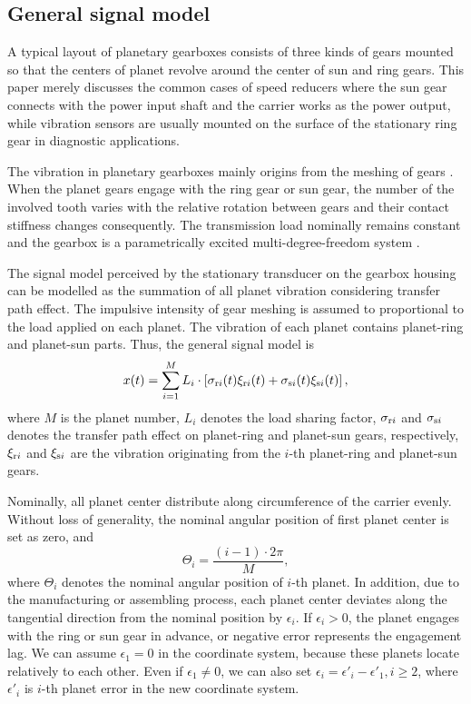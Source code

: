 \documentclass[a4paper,fleqn]{cas-sc}%
\begin{document}
\subsection{General signal model}
\par A typical layout of planetary gearboxes consists of three kinds of gears mounted so that the centers of planet revolve around the center of sun and ring gears. This paper merely discusses the common cases of speed reducers where the sun gear connects with the power input shaft and the carrier works as the power output, while vibration sensors are usually mounted on the surface of the stationary ring gear in diagnostic applications. 

\par The vibration in planetary gearboxes mainly origins from the meshing of gears \cite{Velex1996}. When the planet gears engage with the ring gear or sun gear, the number of the involved tooth varies with the relative rotation between gears and their contact stiffness changes consequently. The transmission load nominally remains constant and the gearbox is a parametrically excited multi-degree-freedom system \cite{Acar2019}. 
\par The signal model perceived by the stationary transducer on the gearbox housing can be modelled as the summation of all planet vibration considering transfer path effect. The impulsive intensity of gear meshing is assumed to proportional to the load applied on each planet. The vibration of each planet contains planet-ring and planet-sun parts. Thus, the general signal model is
\begin{equation}
    x(t)=\sum_{i=1}^{M} L_i \cdot \left[ \sigma_{{\rm r}i}(t) \xi_{{\rm r}i}(t) + \sigma_{{\rm s}i}(t) \xi_{{\rm s}i}(t) \right], \label{eq:general_signal}
\end{equation}
where $M$ is the planet number, $L_i$ denotes the load sharing factor, $\sigma_{{\rm r}i}$ and $\sigma_{{\rm s}i}$ denotes the transfer path effect on planet-ring and planet-sun gears, respectively, $\xi_{{\rm r}i}$ and $\xi_{{\rm s}i}$ are the vibration originating from the $i$-th planet-ring and planet-sun gears.
\par Nominally, all planet center distribute along circumference of the carrier evenly. Without loss of generality, the nominal angular position of first planet center is set as zero, and
\begin{equation}
    \Theta_i=\frac{(i-1)\cdot 2\pi}{M},
\end{equation}
where $\Theta_i$ denotes the nominal angular position of $i$-th planet. In addition, due to the manufacturing or assembling process, each planet center deviates along the tangential direction from the nominal position by $\epsilon_i$. If $\epsilon_i>0$, the planet engages with the ring or sun gear in advance, or negative error represents the engagement lag. We can assume $\epsilon_1=0$ in the coordinate system, because these planets locate relatively to each other. Even if $\epsilon_1 \neq 0$, we can also set $\epsilon_i=\epsilon'_i-\epsilon'_1,i \geq 2$, where $\epsilon'_i$ is $i$-th planet error in the new coordinate system.
\end{document}
